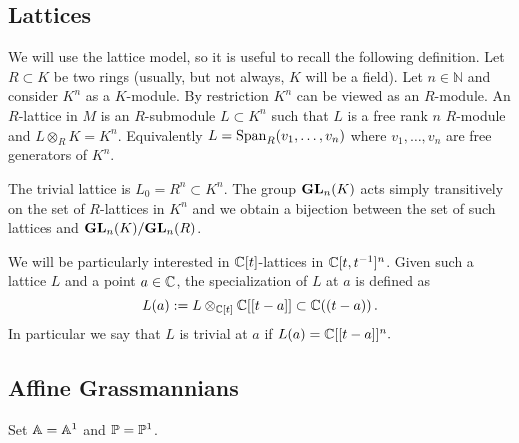 \documentclass{article}
\begin{document}

\subsection{Lattices}
\label{ss:lat}
We will use the lattice model, so it is useful to recall the following definition.  Let $ R \subset K$ be two rings (usually, but not always, $K $ will be a field).  Let $ n \in \mathbb N$ and consider $ K^n $ as a $K$-module.   By restriction $ K^n$ can be viewed as an $R$-module.  An $R$-lattice in $ M$ is an $R$-submodule $ L \subset K^n$ such that $ L $ is a free rank $ n $ $R$-module and $ L \otimes_R K = K^n $.  Equivalently $ L = \Sp_R(v_1, \dots, v_n)$ where $ v_1, \dots, v_n$ are free generators of $K^n$.  

The trivial lattice is $L_0 = R^n \subset K^n $.  The group $\GL_n(K) $ acts simply transitively on the set of $ R$-lattices in $K^n$ and we obtain a bijection between the set of such lattices and $\GL_n(K)/\GL_n(R)$.

We will be particularly interested in $\CC[t]$-lattices in $ \CC[t,t^{-1}]^n$.  Given such a lattice $ L $ and a point $ a \in \CC$, the specialization of $ L $ at $ a $ is defined as
$$
L(a) := L \otimes_{\CC[t]} \CC[[t-a]] \subset \CC((t-a))\,.
$$
In particular we say that $ L $ is trivial at $ a $ if $ L(a) = \CC[[t-a]]^n.$



\subsection{Affine Grassmannians} %

Set $\AA = \AA^1$ and $\PP = \PP^1$. 
\end{document}

